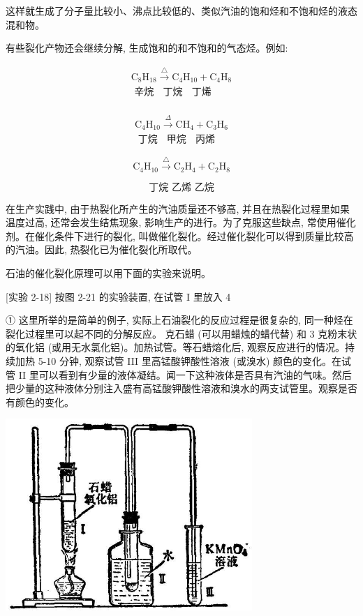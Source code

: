 \documentclass[10pt]{article}
\begin{document}
这样就生成了分子量比较小、沸点比较低的、类似汽油的饱和烃和不饱和烃的液态混和物。

有些裂化产物还会继续分解, 生成饱和的和不饱和的气态烃。例如:

\[
\begin{array}{l} {\mathrm{C}}_{8}{\mathrm{H}}_{18}\overset{\bigtriangleup }{ \rightarrow }{\mathrm{C}}_{4}{\mathrm{H}}_{10} + {\mathrm{C}}_{4}{\mathrm{H}}_{8} \\ \text{ 辛烷 }\;\text{ 丁烷 }\;\text{ 丁烯 } \\ \end{array}
\]

\[
\begin{matrix} {\mathrm{C}}_{4}{\mathrm{H}}_{10}\overset{\Delta }{ \rightarrow }{\mathrm{{CH}}}_{4} + {\mathrm{C}}_{3}{\mathrm{H}}_{6} \\ \text{ 丁烷 }\;\text{ 甲烷 }\;\text{ 丙烯 } \end{matrix}
\]

\[
{\mathrm{C}}_{4}{\mathrm{H}}_{10}\overset{\bigtriangleup }{ \rightarrow }{\mathrm{C}}_{2}{\mathrm{H}}_{4} + {\mathrm{C}}_{2}{\mathrm{H}}_{8}
\]

\[
\text{丁烷 乙烯 乙烷}
\]

在生产实践中, 由于热裂化所产生的汽油质量还不够高, 并且在热裂化过程里如果温度过高, 还常会发生结焦现象, 影响生产的进行。为了克服这些缺点, 常使用催化剂。在催化条件下进行的裂化, 叫做催化裂化。经过催化裂化可以得到质量比较高的汽油。因此, 热裂化已为催化裂化所取代。

石油的催化裂化原理可以用下面的实验来说明。

[实验 2-18] 按图 2-21 的实验装置, 在试管 I 里放入 4

① 这里所举的是简单的例子, 实际上石油裂化的反应过程是很复杂的, 同一种烃在裂化过程里可以起不同的分解反应。 克石蜡 (可以用蜡烛的蜡代替) 和 3 克粉末状的氧化铝 (或用无水氯化铝)。加热试管。等石蜡熔化后, 观察反应进行的情况。持续加热 5-10 分钟, 观察试管 III 里高锰酸钾酸性溶液 (或溴水) 颜色的变化。在试管 II 里可以看到有少量的液体凝结。闻一下这种液体是否具有汽油的气味。然后把少量的这种液体分别注入盛有高锰酸钾酸性溶液和溴水的两支试管里。观察是否有颜色的变化。

\begin{center}
\includegraphics[max width=0.7\textwidth]{images/01912d16-be99-77bb-9535-4f3ed8d9946f_99_556962.jpg}
\end{center}
\end{document}
